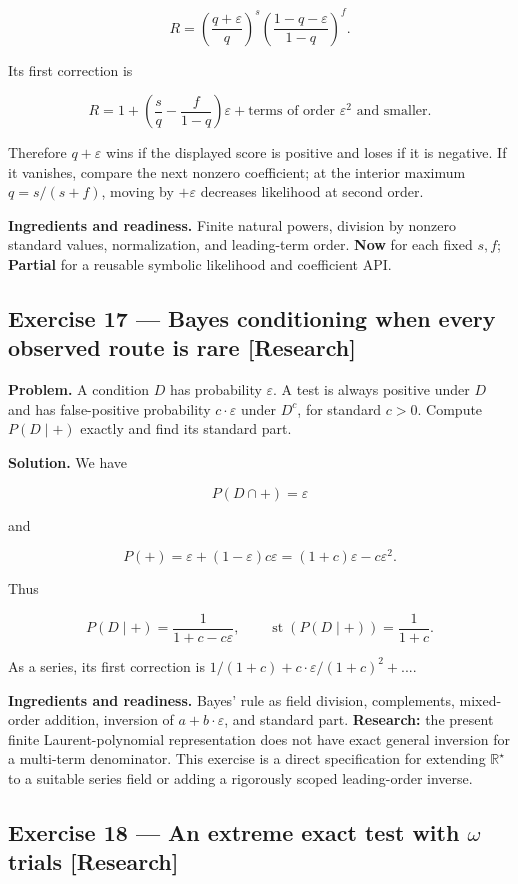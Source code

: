 \documentclass[11pt]{article}
\newcommand{\Rstar}{\mathbb{R}^{\star}}
\newcommand{\eps}{\varepsilon}
\renewcommand{\epsilon}{\varepsilon}
\begin{document}
\[
R=\left(\frac{q+\epsilon}{q}\right)^s
  \left(\frac{1-q-\epsilon}{1-q}\right)^f.
\]

Its first correction is

\[
R=1+\left(\frac{s}{q}-\frac{f}{1-q}\right)\epsilon
  +\text{terms of order }\epsilon^2\text{ and smaller}.
\]

Therefore $q+\eps$ wins if the displayed score is positive and loses if it
is negative. If it vanishes, compare the next nonzero coefficient; at the
interior maximum $q=s/(s+f)$, moving by $+\eps$ decreases likelihood at
second order.

\textbf{Ingredients and readiness.} Finite natural powers, division by nonzero
standard values, normalization, and leading-term order. \textbf{Now} for each fixed
$s,f$; \textbf{Partial} for a reusable symbolic likelihood and coefficient API.


\subsection*{Exercise 17 --- Bayes conditioning when every observed route is rare \hfill \normalfont\small[Research]}

\textbf{Problem.} A condition $D$ has probability $\eps$. A test is always
positive under $D$ and has false-positive probability $c\cdot \eps$ under
$D^c$, for standard $c>0$. Compute $P(D\mid +)$ exactly and find its
standard part.

\textbf{Solution.} We have

\[
P(D\cap +)=\epsilon
\]

and

\[
P(+)=\epsilon+(1-\epsilon)c\epsilon
=(1+c)\epsilon-c\epsilon^2.
\]

Thus

\[
P(D\mid +)=\frac{1}{1+c-c\epsilon},
\qquad
\operatorname{st}(P(D\mid +))=\frac1{1+c}.
\]

As a series, its first correction is
$1/(1+c) + c\cdot \eps/(1+c)^2 + ...$.

\textbf{Ingredients and readiness.} Bayes' rule as field division, complements,
mixed-order addition, inversion of $a+b\cdot \eps$, and standard part.
\textbf{Research:} the present finite Laurent-polynomial representation does not
have exact general inversion for a multi-term denominator. This exercise is a
direct specification for extending $\Rstar$ to a suitable series field or adding
a rigorously scoped leading-order inverse.


\subsection*{Exercise 18 --- An extreme exact test with $\omega$ trials \hfill \normalfont\small[Research]}
\end{document}
